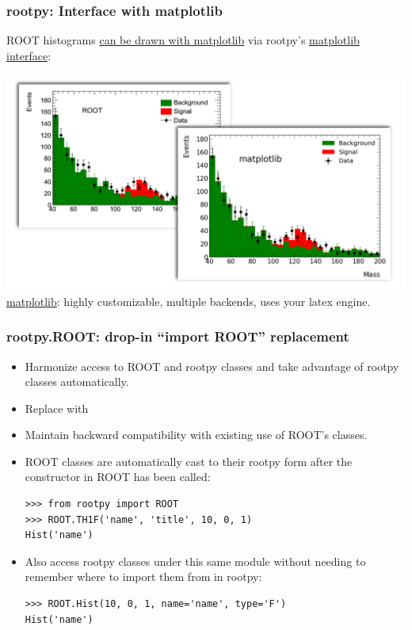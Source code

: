 \documentclass[10pt,professionalfonts,serif,usenames,dvipsnames,svgnames,table]{beamer}
\begin{document}
\begin{frame}
    \frametitle{rootpy: Interface with matplotlib}
    ROOT histograms
    \href{https://github.com/rootpy/rootpy/blob/master/examples/plotting/plot_matplotlib_hist.py}{
    can be drawn with matplotlib} via rootpy's
    \href{https://github.com/rootpy/rootpy/blob/master/rootpy/plotting/root2matplotlib.py}{
    matplotlib interface}:
    \begin{center}
    \includegraphics[width=.9\textwidth]{figs/examples/matplotlib_example.png}\\
    \href{http://matplotlib.org/gallery.html}{matplotlib}: highly customizable,
    multiple backends, uses your latex engine.
\end{center}
\end{frame}

\begin{frame}[fragile]
    \frametitle{rootpy.ROOT: drop-in ``import ROOT'' replacement}

    \begin{itemize}
    \itemsep=0.3cm
\item Harmonize access to ROOT and rootpy classes and take advantage of rootpy classes automatically.

\item Replace  with 

\item Maintain backward compatibility with existing use of ROOT's classes.

\item ROOT classes are automatically cast to their rootpy form after the constructor in ROOT has been called:
    \begin{verbatim}
>>> from rootpy import ROOT
>>> ROOT.TH1F('name', 'title', 10, 0, 1)
Hist('name')
    \end{verbatim}

\item Also access rootpy classes under this same module without needing to remember where to import them from in rootpy:
    \begin{verbatim}
>>> ROOT.Hist(10, 0, 1, name='name', type='F')
Hist('name')
    \end{verbatim}
\end{itemize}

\end{frame}
\end{document}
